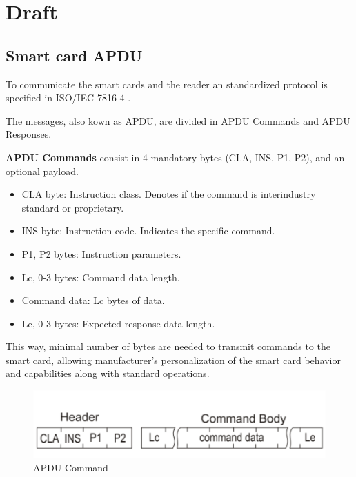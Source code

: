 \chapter{Draft}\label{ch:draft}



\section{Smart card APDU}

To communicate the smart cards and the reader an standardized protocol is specified in ISO/IEC 7816-4 \citep{APDUISO}.

The messages, also kown as \ac{APDU}, are divided in APDU Commands and APDU Responses.

\textbf{APDU Commands} consist in 4 mandatory bytes (CLA, INS, P1, P2), and an optional payload.

\begin{itemize}
	\item CLA byte: Instruction class. Denotes if the command is interindustry standard or proprietary.
	\item INS byte: Instruction code. Indicates the specific command.
	\item P1, P2 bytes: Instruction parameters.
	\item Lc, 0-3 bytes: Command data length.
	\item Command data: Lc bytes of data.
	\item Le, 0-3 bytes: Expected response data length.
\end{itemize}

This way, minimal number of bytes are needed to transmit commands to the smart card, allowing manufacturer's personalization of the smart card behavior and capabilities along with standard operations.

\begin{figure}[bth]
	\begin{center}
		\includegraphics[width=0.55\linewidth]{gfx/APDUCommand}
	\end{center}
	\caption{APDU Command}
	\label{fig:APDUCommand}
\end{figure}


